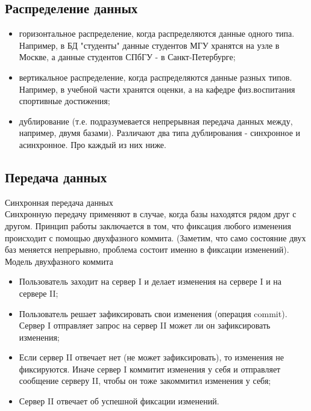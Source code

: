 \subsection {Распределение данных}

\begin{itemize}
\item горизонтальное распределение, когда распределяются данные одного типа. Например, в БД "студенты" данные студентов МГУ хранятся на узле в Москве, а данные студентов СПбГУ - в Санкт-Петербурге; 

\item вертикальное распределение, когда распределяются данные разных типов. Например, в учебной части хранятся оценки, а на кафедре физ.воспитания спортивные достижения;

\item дублирование (т.е. подразумевается непрерывная передача данных между, например, двумя базами). Различают два типа дублирования - синхронное и асинхронное. Про каждый из них ниже.
\end{itemize}

\subsection {Передача данных}\hypertarget{b_10_sending}{}
Синхронная передача данных \\
Синхронную передачу применяют в случае, когда базы находятся рядом друг с другом. Принцип работы заключается в том, что фиксация любого изменения происходит с помощью двухфазного коммита. (Заметим, что само состояние двух баз меняется непрерывно, проблема состоит именно в фиксации изменений). \\ 
Модель двухфазного коммита
\begin {itemize}
\item Пользователь заходит на сервер I и делает изменения на сервере I и на сервере II;
\item Пользователь решает зафиксировать свои изменения (операция commit). Сервер I отправляет запрос на сервер II может ли он зафиксировать изменения;
\item Если сервер II отвечает нет (не может зафиксировать), то изменения не фиксируются. Иначе сервер I коммитит изменения у себя и отправляет сообщение серверу II, чтобы он тоже закоммитил изменения у себя; 
\item Сервер II отвечает об успешной фиксации изменений.
\end {itemize}

